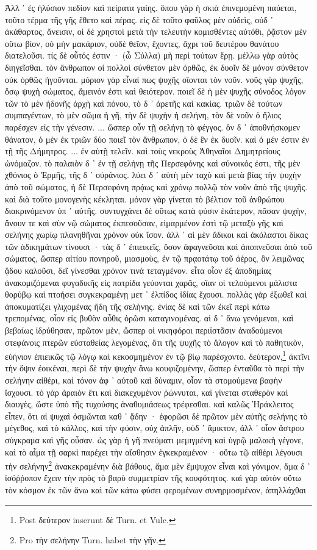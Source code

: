 \documentclass[a4paper, 11pt, oneside, polutonikogreek, german]{article}
\begin{document}
Ἀλλ ᾽ ἐς ἠλύσιον πεδίον καὶ πείρατα γαίης. ὅπου γὰρ ἡ σκιὰ ἐπινεμομένη παύεται, τοῦτο τέρμα τῆς γῆς ἔθετο καὶ πέρας. εἰς δὲ τοῦτο φαῦλος μὲν οὐδεὶς, οὐδ ᾽ ἀκάθαρτος, ἄνεισιν, οἱ δὲ χρηστοὶ μετὰ τὴν τελευτὴν κομισθέντες αὐτόθι, ῥᾷστον μὲν οὕτω βίον, οὐ μὴν μακάριον, οὐδὲ θεῖον, ἔχοντες, ἄχρι τοῦ δευτέρου θανάτου διατελοῦσι. τίς δὲ οὗτός ἐστιν · (ὦ Σύλλα) μὴ περὶ τούτων ἔρῃ. μέλλω γὰρ αὐτὸς διηγεῖσθαι. τὸν ἄνθρωπον οἱ πολλοὶ σύνθετον μὲν ὀρθῶς, ἐκ δυοῖν δὲ μόνον σύνθετον οὐκ ὀρθῶς ἡγοῦνται. μόριον γὰρ εἶναί πως ψυχῆς οἴονται τὸν νοῦν. νοῦς γὰρ ψυχῆς, ὅσῳ ψυχὴ σώματος, ἄμεινόν ἐστι καὶ θειότερον. ποιεῖ δὲ ἡ μὲν ψυχῆς σύνοδος λόγον τῶν τὸ μὲν ἡδονῆς ἀρχὴ καὶ πόνου, τὸ δ ᾽ ἀρετῆς καὶ κακίας. τριῶν δὲ τούτων συμπαγέντων, τὸ μὲν σῶμα ἡ γῆ, τὴν δὲ ψυχὴν ἡ σελήνη, τὸν δὲ νοῦν ὁ ἥλιος παρέσχεν εἰς τὴν γένεσιν. ... ὥσπερ οὖν τῇ σελήνῃ τὸ φέγγος. ὃν δ ᾽ ἀποθνήσκομεν θάνατον, ὁ μὲν ἐκ τριῶν δύο ποιεῖ τὸν ἄνθρωπον, ὁ δὲ ἓν ἐκ δυοῖν. καὶ ὁ μέν ἐστιν ἐν τῇ τῆς Δήμητρος. ... ἐν αὐτῇ τελεῖν. καὶ τοὺς νεκροὺς Ἀθηναῖοι Δημητρείους ὠνόμαζον. τὸ παλαιὸν δ ᾽ ἐν τῇ σελήνῃ τῆς Περσεφόνης καὶ σύνοικός ἐστι, τῆς μὲν χθόνιος ὁ Ἑρμῆς, τῆς δ ᾽ οὐράνιος. λύει δ ᾽ αὐτὴ μὲν ταχὺ καὶ μετὰ βίας τὴν ψυχὴν ἀπὸ τοῦ σώματος, ἡ δὲ Περσεφόνη πρᾴως καὶ χρόνῳ πολλῷ τὸν νοῦν ἀπὸ τῆς ψυχῆς. καὶ διὰ τοῦτο μονογενὴς κέκληται. μόνον γὰρ γίνεται τὸ βέλτιον τοῦ ἀνθρώπου διακρινόμενον ὑπ ᾽ αὐτῆς. συντυγχάνει δὲ οὕτως κατὰ φύσιν ἑκάτερον, πᾶσαν ψυχὴν, ἄνουν τε καὶ σὺν νῷ σώματος ἐκπεσοῦσαν, εἱμαρμένον ἐστὶ τῷ μεταξὺ γῆς καὶ σελήνης χωρίῳ πλανηθῆναι χρόνον οὐκ ἴσον. ἀλλ ᾽ αἱ μὲν ἄδικοι καὶ ἀκόλαστοι δίκας τῶν ἀδικημάτων τίνουσι · τὰς δ ᾽ ἐπιεικεῖς, ὅσον ἀφαγνεῦσαι καὶ ἀποπνεῦσαι ἀπὸ τοῦ σώματος, ὥσπερ αἰτίου πονηροῦ, μιασμοὺς, ἐν τῷ πρᾳοτάτῳ τοῦ ἀέρος, ὃν λειμῶνας ᾅδου καλοῦσι, δεῖ γίνεσθαι χρόνον τινὰ τεταγμένον. εἶτα οἷον ἐξ ἀποδημίας ἀνακομιζόμεναι φυγαδικῆς εἰς πατρίδα γεύονται χαρᾶς, οἵαν οἱ τελούμενοι μάλιστα θορύβῳ καὶ πτοήσει συγκεκραμένῃ μετ ᾽ ἐλπίδος ἰδίας ἔχουσι. πολλὰς γὰρ ἐξωθεῖ καὶ ἀποκυματίζει γλιχομένας ἤδη τῆς σελήνης. ἐνίας δὲ καὶ τῶν ἐκεῖ περὶ κάτω τρεπομένας, οἷον εἰς βυθὸν αὖθις ὁρῶσι καταγινομένας. αἱ δ ᾽ ἄνω γενόμεναι, καὶ βεβαίως ἱδρύθησαν, πρῶτον μὲν, ὥσπερ οἱ νικηφόροι περιϊστᾶσιν ἀναδούμενοι στεφάνοις πτερῶν εὐσταθείας λεγομένας, ὅτι τῆς ψυχῆς τὸ ἄλογον καὶ τὸ παθητικὸν, εὐήνιον ἐπιεικῶς τῷ λόγῳ καὶ κεκοσμημένον ἐν τῷ βίῳ παρέσχοντο. δεύτερον,\footnote{Post δεύτερον inserunt δὲ Turn. et Vulc.} ἀκτῖνι τὴν ὄψιν ἐοικέναι, περὶ δὲ τὴν ψυχὴν ἄνω κουφιζομένην, ὥσπερ ἐνταῦθα τὸ περὶ τὴν σελήνην αἰθέρι, καὶ τόνον ἀφ ᾽ αὑτοῦ καὶ δύναμιν, οἷον τὰ στομούμενα βαφὴν ἴσχουσι. τὸ γὰρ ἀραιὸν ἔτι καὶ διακεχυμένον ῥώννυται, καὶ γίνεται σταθερὸν καὶ διαυγὲς, ὥστε ὑπὸ τῆς τυχούσης ἀναθυμιάσεως τρέφεσθαι. καὶ καλῶς Ἡράκλειτος εἶπεν, ὅτι αἱ ψυχαὶ ὀσμῶνται καθ ᾽ ᾅδην · ἐφορῶσι δὲ πρῶτον μὲν αὐτῆς σελήνης τὸ μέγεθος, καὶ τὸ κάλλος, καὶ τὴν φύσιν, οὐχ ἁπλῆν, οὐδ ᾽ ἄμικτον, ἀλλ ᾽ οἷον ἄστρου σύγκραμα καὶ γῆς οὖσαν. ὡς γὰρ ἡ γῆ πνεύματι μεμιγμένη καὶ ὑγρῷ μαλακὴ γέγονε, καὶ τὸ αἷμα τῇ σαρκὶ παρέχει τὴν αἴσθησιν ἐγκεκραμένον · οὕτω τῷ αἰθέρι λέγουσι τὴν σελήνην\footnote{Pro τὴν σελήνην Turn. habet τὴν γῆν.} ἀνακεκραμένην διὰ βάθους, ἅμα μὲν ἔμψυχον εἶναι καὶ γόνιμον, ἅμα δ ᾽ ἰσόῤῥοπον ἔχειν τὴν πρὸς τὸ βαρὺ συμμετρίαν τῆς κουφότητος. καὶ γὰρ αὐτὸν οὕτω τὸν κόσμον ἐκ τῶν ἄνω καὶ τῶν κάτω φύσει φερομένων συνηρμοσμένον, ἀπηλλάχθαι 
\end{document}
